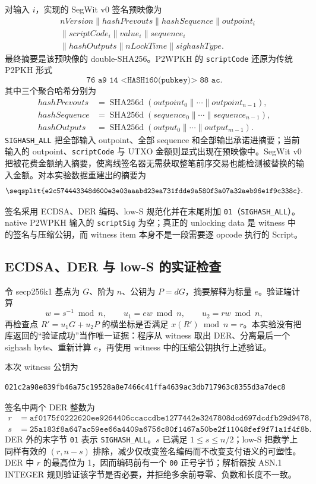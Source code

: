 \documentclass[11pt,a4paper,fontset=none]{ctexart}
\begin{document}
对输入 $i$，实现的 SegWit v0 签名预映像为
\begin{align*}
&nVersion \parallel hashPrevouts \parallel hashSequence \parallel outpoint_i\\
&\parallel scriptCode_i \parallel value_i \parallel sequence_i\\
&\parallel hashOutputs \parallel nLockTime \parallel sighashType.
\end{align*}
最终摘要是该预映像的 double-SHA256。P2WPKH 的 \texttt{scriptCode} 还原为传统 P2PKH 形式
\[
\texttt{76 a9 14 <HASH160(pubkey)> 88 ac}.
\]
其中三个聚合哈希分别为
\begin{align*}
 hashPrevouts &= \operatorname{SHA256d}(outpoint_0\parallel\cdots\parallel outpoint_{n-1}),\\
 hashSequence &= \operatorname{SHA256d}(sequence_0\parallel\cdots\parallel sequence_{n-1}),\\
 hashOutputs  &= \operatorname{SHA256d}(output_0\parallel\cdots\parallel output_{m-1}).
\end{align*}
\texttt{SIGHASH\_ALL} 把全部输入 outpoint、全部 sequence 和全部输出承诺进摘要；当前输入的 outpoint、\texttt{scriptCode} 与 UTXO 金额则显式出现在预映像中。SegWit v0 把被花费金额纳入摘要，使离线签名器无需获取整笔前序交易也能检测被替换的输入金额。对本实验数据重建出的摘要为
\[
\texttt{\seqsplit{e2c574443348d600e3e03aaabd23ea731fdde9a580f3a07a32aeb96e1f9c338c}}.
\]

签名采用 ECDSA、DER 编码、low-S 规范化并在末尾附加 \texttt{01}（\texttt{SIGHASH\_ALL}）。native P2WPKH 输入的 \texttt{scriptSig} 为空；真正的 unlocking data 是 witness 中的签名与压缩公钥，而 witness item 本身不是一段需要逐 opcode 执行的 Script。

\subsection{ECDSA、DER 与 low-S 的实证检查}

令 secp256k1 基点为 $G$、阶为 $n$、公钥为 $P=dG$，摘要解释为标量 $e$。验证端计算
\[
w=s^{-1}\bmod n,\qquad u_1=ew\bmod n,\qquad u_2=rw\bmod n,
\]
再检查点 $R'=u_1G+u_2P$ 的横坐标是否满足 $x(R')\bmod n=r$。本实验没有把库返回的“验证成功”当作唯一证据：程序从 witness 取出 DER、分离最后一个 sighash byte、重新计算 $e$，再使用 witness 中的压缩公钥执行上述验证。

本次 witness 公钥为
\begin{lstlisting}[language={}]
021c2a98e839fb46a75c19528a8e7466c41ffa4639ac3db717963c8355d3a7dec8
\end{lstlisting}
签名中两个 DER 整数为
\begin{align*}
r&=\texttt{af0175f0222620ee9264406ccaccdbe1277442e3247808dcd697dcdfb29d9478},\\
s&=\texttt{25a183f8a647ac59ee66a4409a6756c80f1467a50be2f11048fef9f71a1f4f8b}.
\end{align*}
DER 外的末字节 \texttt{01} 表示 \texttt{SIGHASH\_ALL}。$s$ 已满足 $1\le s\le n/2$；low-S 把数学上同样有效的 $(r,n-s)$ 排除，减少仅改变签名编码而不改变支付语义的可塑性。DER 中 $r$ 的最高位为 1，因而编码前有一个 \texttt{00} 正号字节；解析器按 ASN.1 INTEGER 规则验证该字节是否必要，并拒绝多余前导零、负数和长度不一致。
\end{document}
